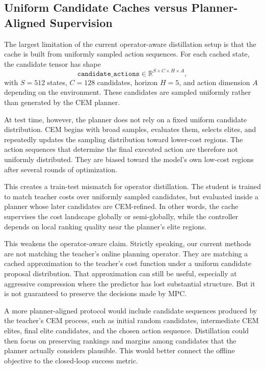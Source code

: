 \documentclass[11pt]{article}
\begin{document}
\subsection{Uniform Candidate Caches versus Planner-Aligned Supervision}
\label{sec:uniform_cache_analysis}

The largest limitation of the current operator-aware distillation setup is that the cache is built from uniformly sampled action sequences. For each cached state, the candidate tensor has shape
\[
    \texttt{candidate\_actions}
    \in
    \mathbb{R}^{S \times C \times H \times A},
\]
with \(S=512\) states, \(C=128\) candidates, horizon \(H=5\), and action dimension \(A\) depending on the environment. These candidates are sampled uniformly rather than generated by the CEM planner.

At test time, however, the planner does not rely on a fixed uniform candidate distribution. CEM begins with broad samples, evaluates them, selects elites, and repeatedly updates the sampling distribution toward lower-cost regions. The action sequences that determine the final executed action are therefore not uniformly distributed. They are biased toward the model's own low-cost regions after several rounds of optimization.

This creates a train-test mismatch for operator distillation. The student is trained to match teacher costs over uniformly sampled candidates, but evaluated inside a planner whose later candidates are CEM-refined. In other words, the cache supervises the cost landscape globally or semi-globally, while the controller depends on local ranking quality near the planner's elite regions.

This weakens the operator-aware claim. Strictly speaking, our current methods are not matching the teacher's online planning operator. They are matching a cached approximation to the teacher's cost function under a uniform candidate proposal distribution. That approximation can still be useful, especially at aggressive compression where the predictor has lost substantial structure. But it is not guaranteed to preserve the decisions made by MPC.

A more planner-aligned protocol would include candidate sequences produced by the teacher's CEM process, such as initial random candidates, intermediate CEM elites, final elite candidates, and the chosen action sequence. Distillation could then focus on preserving rankings and margins among candidates that the planner actually considers plausible. This would better connect the offline objective to the closed-loop success metric.
\end{document}
